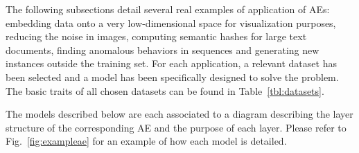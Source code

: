 \documentclass[
	fontsize=11pt, %
	twoside=false, %
	open=any, %
	secnumdepth=1, %
]{kaobook}
\begin{document}
The following subsections detail several real examples of application of AEs: embedding data onto a very low-dimensional space for visualization purposes, reducing the noise in images, computing semantic hashes for large text documents, finding anomalous behaviors in sequences and generating new instances outside the training set. For each application, a relevant dataset has been selected and a model has been specifically designed to solve the problem. The basic traits of all chosen datasets can be found in Table~\ref{tbl:datasets}.


\begin{table}[hb]
    \centering
    \caption{\label{tbl:datasets}Main traits of datasets used for the experiments}
\end{table}


The models described below are each associated to a diagram describing the layer structure of the corresponding AE and the purpose of each layer. Please refer to Fig.~\ref{fig:exampleae} for an example of how each model is detailed.
\end{document}
